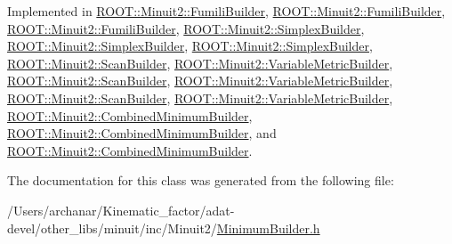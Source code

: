 Implemented in \mbox{\hyperlink{classROOT_1_1Minuit2_1_1FumiliBuilder_a6e598ea8d57750ec860595ba494bb501}{R\+O\+O\+T\+::\+Minuit2\+::\+Fumili\+Builder}}, \mbox{\hyperlink{classROOT_1_1Minuit2_1_1FumiliBuilder_aa1889039835b4117cb2a9b7d49e4f6dd}{R\+O\+O\+T\+::\+Minuit2\+::\+Fumili\+Builder}}, \mbox{\hyperlink{classROOT_1_1Minuit2_1_1FumiliBuilder_aa1889039835b4117cb2a9b7d49e4f6dd}{R\+O\+O\+T\+::\+Minuit2\+::\+Fumili\+Builder}}, \mbox{\hyperlink{classROOT_1_1Minuit2_1_1SimplexBuilder_a82c52765929e3f4a41b1abe1473d4140}{R\+O\+O\+T\+::\+Minuit2\+::\+Simplex\+Builder}}, \mbox{\hyperlink{classROOT_1_1Minuit2_1_1SimplexBuilder_a68ea5d16ee89941e9674eb673dbde593}{R\+O\+O\+T\+::\+Minuit2\+::\+Simplex\+Builder}}, \mbox{\hyperlink{classROOT_1_1Minuit2_1_1SimplexBuilder_a68ea5d16ee89941e9674eb673dbde593}{R\+O\+O\+T\+::\+Minuit2\+::\+Simplex\+Builder}}, \mbox{\hyperlink{classROOT_1_1Minuit2_1_1ScanBuilder_ad53e9711dc8a63958845ac6e6eb5250f}{R\+O\+O\+T\+::\+Minuit2\+::\+Scan\+Builder}}, \mbox{\hyperlink{classROOT_1_1Minuit2_1_1VariableMetricBuilder_a56d18a37b8643611ff80875b91915784}{R\+O\+O\+T\+::\+Minuit2\+::\+Variable\+Metric\+Builder}}, \mbox{\hyperlink{classROOT_1_1Minuit2_1_1ScanBuilder_a24547691823b9f0977e6b23b6d084e7a}{R\+O\+O\+T\+::\+Minuit2\+::\+Scan\+Builder}}, \mbox{\hyperlink{classROOT_1_1Minuit2_1_1VariableMetricBuilder_af39ef2e38ec2bf3d94fa78fe0ed9a64a}{R\+O\+O\+T\+::\+Minuit2\+::\+Variable\+Metric\+Builder}}, \mbox{\hyperlink{classROOT_1_1Minuit2_1_1ScanBuilder_a24547691823b9f0977e6b23b6d084e7a}{R\+O\+O\+T\+::\+Minuit2\+::\+Scan\+Builder}}, \mbox{\hyperlink{classROOT_1_1Minuit2_1_1VariableMetricBuilder_af39ef2e38ec2bf3d94fa78fe0ed9a64a}{R\+O\+O\+T\+::\+Minuit2\+::\+Variable\+Metric\+Builder}}, \mbox{\hyperlink{classROOT_1_1Minuit2_1_1CombinedMinimumBuilder_a44282b6271b536b7fc6b80af16ac67ef}{R\+O\+O\+T\+::\+Minuit2\+::\+Combined\+Minimum\+Builder}}, \mbox{\hyperlink{classROOT_1_1Minuit2_1_1CombinedMinimumBuilder_a5439a04b01ff94a8f790443b867d6e53}{R\+O\+O\+T\+::\+Minuit2\+::\+Combined\+Minimum\+Builder}}, and \mbox{\hyperlink{classROOT_1_1Minuit2_1_1CombinedMinimumBuilder_a5439a04b01ff94a8f790443b867d6e53}{R\+O\+O\+T\+::\+Minuit2\+::\+Combined\+Minimum\+Builder}}.



The documentation for this class was generated from the following file\+:\begin{DoxyCompactItemize}
\item 
/\+Users/archanar/\+Kinematic\+\_\+factor/adat-\/devel/other\+\_\+libs/minuit/inc/\+Minuit2/\mbox{\hyperlink{adat-devel_2other__libs_2minuit_2inc_2Minuit2_2MinimumBuilder_8h}{Minimum\+Builder.\+h}}\end{DoxyCompactItemize}
